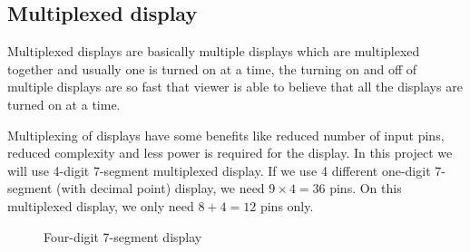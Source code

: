 \documentclass[13pt,a4paper,twoside]{report}
\begin{document}
\subsection{Multiplexed display}
Multiplexed displays are basically multiple displays which are multiplexed together and usually one is turned on at a time, the turning on and off of multiple displays are so fast that viewer is able to believe that all the displays are turned on at a time. \cite{multiplex_7seg}
 
Multiplexing of displays have some benefits like reduced number of input pins, reduced complexity and less power is required for the display. In this project we will use 4-digit 7-segment multiplexed display. If we use 4 different one-digit 7-segment (with decimal point) display, we need $9\times 4=36$ pins. On this multiplexed display, we only need $8 + 4=12$ pins only. 
\begin{figure}[H]
\centering
{}
\end{figure}

\begin{figure}[H]
\centering
{}
\caption{Four-digit 7-segment display\protect\footnotemark}
\end{figure}
\end{document}
